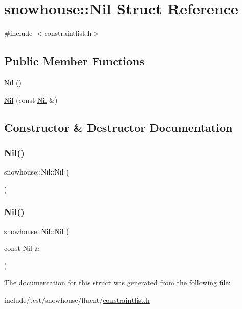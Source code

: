 \hypertarget{structsnowhouse_1_1Nil}{}\section{snowhouse\+::Nil Struct Reference}
\label{structsnowhouse_1_1Nil}


{\ttfamily \#include $<$constraintlist.\+h$>$}

\subsection*{Public Member Functions}
\begin{DoxyCompactItemize}
\item 
\mbox{\hyperlink{structsnowhouse_1_1Nil_a9555a25d223f0ccf739face0402da0a8}{Nil}} ()
\item 
\mbox{\hyperlink{structsnowhouse_1_1Nil_ac10b1071b6b9644e867fbd8a7e7145f3}{Nil}} (const \mbox{\hyperlink{structsnowhouse_1_1Nil}{Nil}} \&)
\end{DoxyCompactItemize}


\subsection{Constructor \& Destructor Documentation}
\mbox{\label{structsnowhouse_1_1Nil_a9555a25d223f0ccf739face0402da0a8}} 
\subsubsection{\texorpdfstring{Nil()}{Nil()}\hspace{0.1cm}{\footnotesize\ttfamily [1/2]}}
{\footnotesize\ttfamily snowhouse\+::\+Nil\+::\+Nil (\begin{DoxyParamCaption}{ }\end{DoxyParamCaption})\hspace{0.3cm}{\ttfamily [inline]}}

\mbox{\label{structsnowhouse_1_1Nil_ac10b1071b6b9644e867fbd8a7e7145f3}} 
\subsubsection{\texorpdfstring{Nil()}{Nil()}\hspace{0.1cm}{\footnotesize\ttfamily [2/2]}}
{\footnotesize\ttfamily snowhouse\+::\+Nil\+::\+Nil (\begin{DoxyParamCaption}\item[{const \mbox{\hyperlink{structsnowhouse_1_1Nil}{Nil}} \&}]{ }\end{DoxyParamCaption})\hspace{0.3cm}{\ttfamily [inline]}}



The documentation for this struct was generated from the following file\+:\begin{DoxyCompactItemize}
\item 
include/test/snowhouse/fluent/\mbox{\hyperlink{constraintlist_8h}{constraintlist.\+h}}\end{DoxyCompactItemize}
